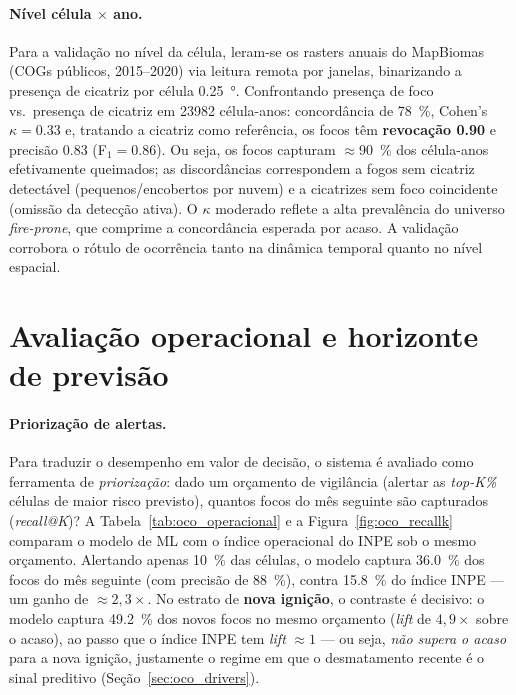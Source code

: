\paragraph{Nível célula \(\times\) ano.} Para a validação no nível da célula, leram-se os
rasters anuais do MapBiomas (COGs públicos, 2015--2020) via leitura remota por janelas,
binarizando a presença de cicatriz por célula \SI{0,25}{\degree}. Confrontando presença de
foco vs.\ presença de cicatriz em \num{23982} célula-anos: concordância de \SI{78}{\percent},
Cohen's \(\kappa=\num{0,33}\) e, tratando a cicatriz como referência, os focos têm
\textbf{revocação \num{0,90}} e precisão \num{0,83} (F\(_1=\num{0,86}\)). Ou seja, os focos
capturam \(\approx\)\SI{90}{\percent} dos célula-anos efetivamente queimados; as discordâncias
correspondem a fogos sem cicatriz detectável (pequenos/encobertos por nuvem) e a cicatrizes
sem foco coincidente (omissão da detecção ativa). O \(\kappa\) moderado reflete a alta
prevalência do universo \emph{fire-prone}, que comprime a concordância esperada por acaso. A
validação corrobora o rótulo de ocorrência tanto na dinâmica temporal quanto no nível espacial.

\section{Avaliação operacional e horizonte de previsão}
\label{sec:oco_operacional}

\paragraph{Priorização de alertas.} Para traduzir o desempenho em valor de decisão,
o sistema é avaliado como ferramenta de \emph{priorização}: dado um orçamento de
vigilância (alertar as \emph{top-K\%} células de maior risco previsto), quantos focos
do mês seguinte são capturados (\emph{recall@K})? A Tabela~\ref{tab:oco_operacional} e a
Figura~\ref{fig:oco_recallk} comparam o modelo de ML com o índice operacional do INPE
sob o mesmo orçamento. Alertando apenas \SI{10}{\percent} das células, o modelo captura
\SI{36,0}{\percent} dos focos do mês seguinte (com precisão de \SI{88}{\percent}), contra
\SI{15,8}{\percent} do índice INPE --- um ganho de \(\approx 2{,}3\times\). No estrato de
\textbf{nova ignição}, o contraste é decisivo: o modelo captura \SI{49,2}{\percent} dos
novos focos no mesmo orçamento (\emph{lift} de \(4{,}9\times\) sobre o acaso), ao passo que
o índice INPE tem \emph{lift} \(\approx 1\) --- ou seja, \emph{não supera o acaso} para a
nova ignição, justamente o regime em que o desmatamento recente é o sinal preditivo
(Seção~\ref{sec:oco_drivers}).

